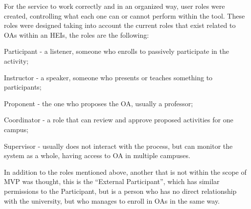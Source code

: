 For the service to work correctly and in an organized way, user roles were created, controlling what each one can or cannot perform within the tool.
These roles were designed taking into account the current roles that exist related to \acp{OA} within an \acp{HEI}, the roles are the following:
\begin{inparaenum}[(1)]
  \item Participant - a listener, someone who enrolls to passively participate in the activity;
  \item Instructor - a speaker, someone who presents or teaches something to participants;
  \item Proponent - the one who proposes the \ac{OA}, usually a professor;
  \item Coordinator - a role that can review and approve proposed activities for one campus;
  \item Supervisor - usually does not interact with the process, but can monitor the system as a whole, having access to \ac{OA} in multiple campuses.
\end{inparaenum}


In addition to the roles mentioned above, another that is not within the scope of \ac{MVP} was thought, this is the ``External Participant'', which has similar permissions to the Participant, but is a person who has no direct relationship with the university, but who manages to enroll in \aclp{OA} in the same way.

